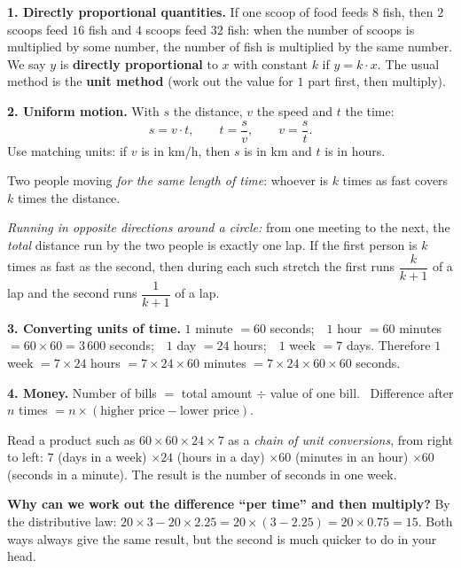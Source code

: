 \begin{knowbox}
\textbf{1. Directly proportional quantities.} If one scoop of food feeds $8$ fish, then $2$ scoops feed $16$ fish and $4$ scoops feed $32$ fish:
when the number of scoops is multiplied by some number, the number of fish is multiplied by the same number. We say $y$ is \textbf{directly proportional} to $x$ with constant $k$ if $y=k\cdot x$.
The usual method is the \textbf{unit method} (work out the value for $1$ part first, then multiply).

\textbf{2. Uniform motion.} With $s$ the distance, $v$ the speed and $t$ the time:
\[ s=v\cdot t,\qquad t=\frac{s}{v},\qquad v=\frac{s}{t}.\]
Use matching units: if $v$ is in km/h, then $s$ is in km and $t$ is in hours.

Two people moving \emph{for the same length of time}: whoever is $k$ times as fast covers $k$ times the distance.

\emph{Running in opposite directions around a circle:} from one meeting to the next, the \emph{total} distance run by the two people is exactly one lap.
If the first person is $k$ times as fast as the second, then during each such stretch the first runs $\dfrac{k}{k+1}$ of a lap and the second runs $\dfrac{1}{k+1}$ of a lap.

\textbf{3. Converting units of time.}
$1$ minute $=60$ seconds;\ \ $1$ hour $=60$ minutes $=60\times 60=3\,600$ seconds;\ \ $1$ day $=24$ hours;\ \ $1$ week $=7$ days.
Therefore $1$ week $=7\times 24$ hours $=7\times 24\times 60$ minutes $=7\times 24\times 60\times 60$ seconds.

\textbf{4. Money.} Number of bills $=$ total amount $\div$ value of one bill. \ Difference after $n$ times
$=n\times(\text{higher price}-\text{lower price})$.
\end{knowbox}

\begin{tipbox}
Read a product such as $60\times 60\times 24\times 7$ as a \emph{chain of unit conversions}, from right to left:
$7$ (days in a week) $\times 24$ (hours in a day) $\times 60$ (minutes in an hour) $\times 60$ (seconds in a minute).
The result is the number of seconds in one week.
\end{tipbox}

\begin{proofbox}
\textbf{Why can we work out the difference ``per time'' and then multiply?} By the distributive law:
$20\times 3-20\times 2.25=20\times(3-2.25)=20\times 0.75=15$. Both ways always give the same result,
but the second is much quicker to do in your head.
\end{proofbox}

